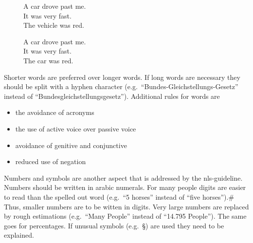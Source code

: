 \begin{figure}[htb]
    \begin{center}
        \colorbox{badred!20}{
            \begin{minipage}{0.6\textwidth}
                A car drove past me.\\
                It was very fast.\\
                The vehicle was red.
            \end{minipage}
        }
        \colorbox{goodgreen!20}{
            \begin{minipage}{0.6\textwidth}
                A car drove past me.\\
                It was very fast.\\
                The car was red.
            \end{minipage}
        }
    \end{center}
    \caption[]{}
    \label{fig:subject_ref}
\end{figure}
Shorter words are preferred over longer words.
If long words are necessary they should be split with a hyphen character (e.g.\ \enquote{Bundes-Gleichstellungs-Gesetz} instead of \enquote{Bundesgleichstellungsgesetz}).
Additional rules for words are
\begin{itemize}[noitemsep]
    \item the avoidance of acronyms
    \item the use of active voice over passive voice
    \item avoidance of genitive and conjunctive
    \item reduced use of negation
\end{itemize}
Numbers and symbols are another aspect that is addressed by the \gls{nls}-guideline.
Numbers should be written in arabic numerals.
For many people digits are easier to read than the spelled out word (e.g.\ \enquote{5 horses} instead of \enquote{five horses}).#
Thus, smaller numbers are to be witten in digits.
Very large numbers are replaced by rough estimations (e.g.\ \enquote{Many People} instead of \enquote{14.795 People}).
The same goes for percentages.
If unusual symbols (e.g.\ §) are used they need to be explained.

